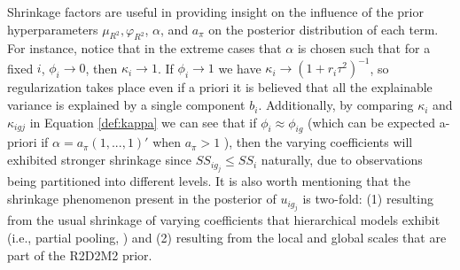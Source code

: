 Shrinkage factors are useful in providing insight on the influence of the prior hyperparameters $\mu_{R^2}, \varphi_{R^2}$, $\alpha$, and $a_\pi$ on the posterior distribution of each term. For instance, notice that in the extreme cases that $\alpha$ is chosen such that for a fixed $i$, $\phi_i \to 0$, then $\kappa_i \to 1$.  If $\phi_i \to 1$ we have $\kappa_i \to (1+ r_i \tau^2)^{-1}$, so regularization takes place even if a priori it is believed that all the explainable variance is explained by a single component $b_i$. Additionally, by comparing $\kappa_i$ and $\kappa_{igj}$ in Equation \eqref{def:kappa} we can see that if $\phi_i \approx \phi_{ig}$ (which can be expected a-priori if $\alpha= a_\pi(1,...,1)'$ when $a_\pi>1$  \citep{OnTheDirichlet}), then the varying coefficients will exhibited stronger shrinkage since $SS_{ig_j}\leq SS_i$ naturally, due to observations being partitioned into different levels. It is also worth mentioning that the shrinkage phenomenon present in the posterior of $u_{ig_j}$ is two-fold: (1) resulting from the usual shrinkage of varying coefficients that hierarchical models exhibit (i.e., partial pooling, \cite{gelman_hill_2006}) and (2) resulting from the local and global scales that are part of the R2D2M2 prior.

